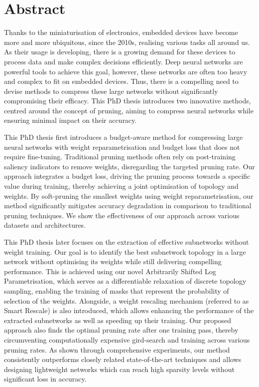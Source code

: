 


\chapter*{Abstract}
Thanks to the miniaturisation of electronics, embedded devices have become
more and more ubiquitous, since the 2010s, realising various tasks all
around us. As their usage is developing, there is a growing demand for these
devices to process data and make complex decisions efficiently. Deep neural
networks are powerful tools to achieve this goal, however, these networks
are often too heavy and complex to fit on embedded devices. Thus, there is a
compelling need to devise methods to compress these large networks without
significantly compromising their efficacy. This PhD thesis introduces two
innovative methods, centred around the concept of pruning, aiming to
compress neural networks while ensuring minimal impact on their accuracy.

This PhD thesis first introduces a budget-aware method for compressing large
neural networks with weight reparametrisation and budget loss that does not
require fine-tuning. Traditional pruning methods often rely on post-training
saliency indicators to remove weights, disregarding the targeted pruning
rate. Our approach integrates a budget loss, driving the pruning process
towards a specific value during training, thereby achieving a joint
optimisation of topology and weights. By soft-pruning the smallest weights
using weight reparametrisation, our method significantly mitigates accuracy
degradation in comparison to traditional pruning techniques. We show the
effectiveness of our approach across various datasets and architectures.

This PhD thesis later focuses on the extraction of effective subnetworks
without weight training. Our goal is to identify the best subnetwork
topology in a large network without optimising its weights while still
delivering compelling performance. This is achieved using our novel
Arbitrarily Shifted Log Parametrisation, which serves as a differentiable
relaxation of discrete topology sampling, enabling the training of masks
that represent the probability of selection of the weights. Alongside, a
weight rescaling mechanism (referred to as Smart Rescale) is also
introduced, which allows enhancing the performance of the extracted
subnetworks as well as speeding up their training. Our proposed approach
also finds the optimal pruning rate after one training pass, thereby
circumventing computationally expensive gird-search and training across
various pruning rates. As shown through comprehensive experiments, our
method consistently outperforms closely related state-of-the-art techniques
and allows designing lightweight networks which can reach high sparsity
levels without significant loss in accuracy.

